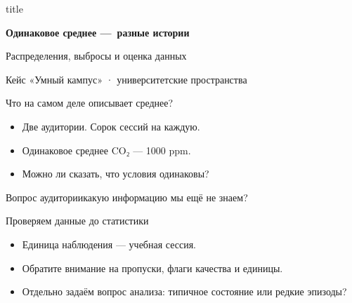 \documentclass[aspectratio=169,10pt]{beamer}
\begin{document}
\begin{frame}[plain]
\begin{beamercolorbox}[wd=\paperwidth,ht=\paperheight,sep=1.4cm,center]{title}
\vspace*{1.0cm}{\large Данные как основа ИИ · семестр 2}\par\vspace{1cm}
{\fontsize{30}{38}\selectfont\bfseries Одинаковое среднее —\ разные истории}\par\vspace{0.6cm}
{\large Распределения, выбросы и оценка данных}\par\vfill{\small Кейс «Умный кампус» · университетские пространства}
\end{beamercolorbox}\end{frame}
\begin{frame}[t]{Что на самом деле описывает среднее?}
\vspace{.15cm}\begin{itemize}
\item Две аудитории. Сорок сессий на каждую.\vspace{6pt}
\item Одинаковое среднее CO₂ — 1000 ppm.\vspace{6pt}
\item Можно ли сказать, что условия одинаковы?\vspace{6pt}
\end{itemize}
\vfill\begin{alertblock}{Вопрос аудитории}\large какую информацию мы ещё не знаем?\end{alertblock}
\end{frame}
\begin{frame}[t]{Проверяем данные до статистики}
\vspace{.15cm}\begin{itemize}
\item Единица наблюдения — учебная сессия.\vspace{6pt}
\item Обратите внимание на пропуски, флаги качества и единицы.\vspace{6pt}
\item Отдельно задаём вопрос анализа: типичное состояние или редкие эпизоды?\vspace{6pt}
\end{itemize}
\end{frame}
\end{document}
